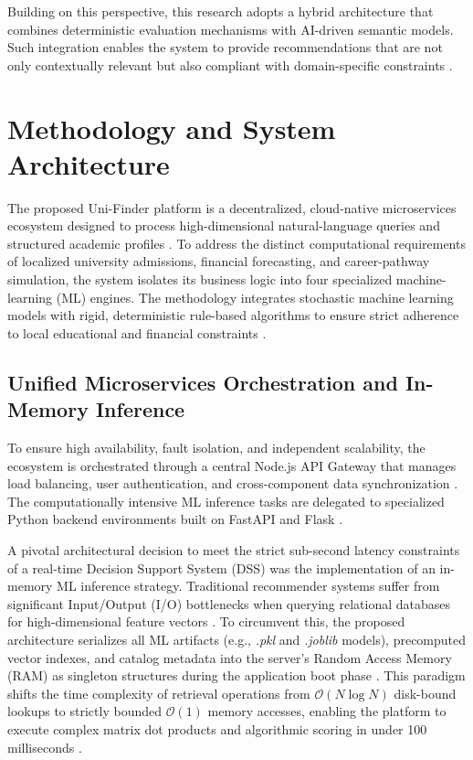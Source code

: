\documentclass[conference]{IEEEtran}
\begin{document}
Building on this perspective, this research adopts a hybrid architecture that combines deterministic evaluation mechanisms with AI-driven semantic models. Such integration enables the system to provide recommendations that are not only contextually relevant but also compliant with domain-specific constraints \cite{chen2021dynamic, li2024dynamic, zhao2025group}.

\section{Methodology and System Architecture}

The proposed Uni-Finder platform is a decentralized, cloud-native microservices ecosystem designed to process high-dimensional natural-language queries and structured academic profiles \cite{silva2026systematic, almadani2023recommender}. To address the distinct computational requirements of localized university admissions, financial forecasting, and career-pathway simulation, the system isolates its business logic into four specialized machine-learning (ML) engines. The methodology integrates stochastic machine learning models with rigid, deterministic rule-based algorithms to ensure strict adherence to local educational and financial constraints \cite{seu2024stream, chen2025integrating}.

\subsection{Unified Microservices Orchestration and In-Memory Inference}
To ensure high availability, fault isolation, and independent scalability, the ecosystem is orchestrated through a central Node.js API Gateway that manages load balancing, user authentication, and cross-component data synchronization \cite{zhang2022state}. The computationally intensive ML inference tasks are delegated to specialized Python backend environments built on FastAPI and Flask \cite{li2024dynamic}.

A pivotal architectural decision to meet the strict sub-second latency constraints of a real-time Decision Support System (DSS) was the implementation of an in-memory ML inference strategy. Traditional recommender systems suffer from significant Input/Output (I/O) bottlenecks when querying relational databases for high-dimensional feature vectors \cite{tarus2018matrix}. To circumvent this, the proposed architecture serializes all ML artifacts (e.g., \textit{.pkl} and \textit{.joblib} models), precomputed vector indexes, and catalog metadata into the server's Random Access Memory (RAM) as singleton structures during the application boot phase \cite{zhang2022state}. This paradigm shifts the time complexity of retrieval operations from $\mathcal{O}(N \log N)$ disk-bound lookups to strictly bounded $\mathcal{O}(1)$ memory accesses, enabling the platform to execute complex matrix dot products and algorithmic scoring in under 100 milliseconds \cite{alghamdi2021collaborative}.
\end{document}
